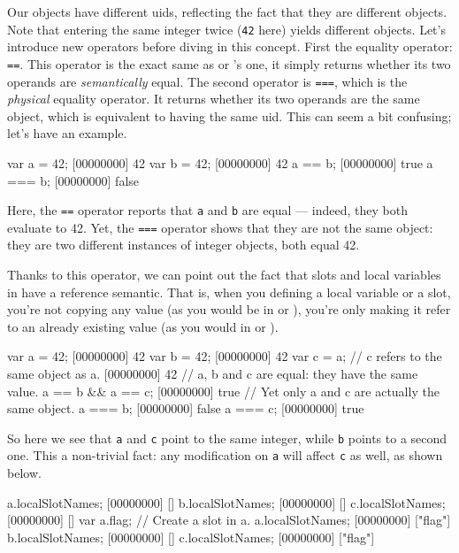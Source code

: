 Our objects have different uids, reflecting the fact that they are
different objects. Note that entering the same integer twice
(\lstinline{42} here) yields different objects. Let's introduce new
operators before diving in this concept. First the equality operator:
\lstinline{==}. This operator is the exact same as \C or \Cxx's one,
it simply returns whether its two operands are \emph{semantically}
equal. The second operator is \lstinline{===}, which is the
\emph{physical} equality operator. It returns whether its two operands
are the same object, which is equivalent to having the same uid. This
can seem a bit confusing; let's have an example.

\begin{urbiscript}[firstnumber=last]
var a = 42;
[00000000] 42
var b = 42;
[00000000] 42
a == b;
[00000000] true
a === b;
[00000000] false
\end{urbiscript}

Here, the \lstinline{==} operator reports that \lstinline{a} and
\lstinline{b} are equal ---
indeed, they both evaluate to 42. Yet, the \lstinline{===} operator shows
that they are not the same object: they are two different
instances of integer objects, both equal 42.

Thanks to this operator, we can point out the fact that slots and
local variables in \us have a reference semantic. That is, when you
defining a local variable or a slot, you're not copying any value (as
you would be in \C or \Cxx), you're only making it refer to an already
existing value (as you would in \ruby or \java).

\begin{urbiscript}
var a = 42;
[00000000] 42
var b = 42;
[00000000] 42
var c = a; // c refers to the same object as a.
[00000000] 42
// a, b and c are equal: they have the same value.
a == b && a == c;
[00000000] true
// Yet only a and c are actually the same object.
a === b;
[00000000] false
a === c;
[00000000] true
\end{urbiscript}

So here we see that \lstinline|a| and \lstinline|c| point to the same
integer, while \lstinline|b| points to a second one. This a
non-trivial fact: any modification on \lstinline|a| will affect
\lstinline|c| as well, as shown below.

\begin{urbiscript}[firstnumber=last]
a.localSlotNames;
[00000000] []
b.localSlotNames;
[00000000] []
c.localSlotNames;
[00000000] []
var a.flag; // Create a slot in a.
a.localSlotNames;
[00000000] ["flag"]
b.localSlotNames;
[00000000] []
c.localSlotNames;
[00000000] ["flag"]
\end{urbiscript}


